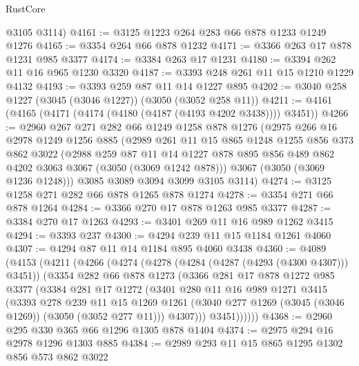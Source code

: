 \begin{lexlean}{RustCore}
\begin{coremodule}
      @3105
      @3114)
@4161 := @3125 @1223 @264 @283 @66 @878 @1233 @1249 @1276
@4165 := @3354 @264 @66 @878 @1232
@4171 := @3366 @263 @17 @878 @1231 @985 @3377
@4174 := @3384 @263 @17 @1231
@4180 := @3394 @262 @11 @16 @965 @1230 @3320
@4187 := @3393 @248 @261 @11 @15 @1210 @1229 @4132
@4193 := @3393 @259 @87 @11 @14 @1227 @895
@4202 := @3040 @258 @1227 (@3045 (@3046 @1227)) (@3050 (@3052 @258 @11))
@4211 := @4161 (@4165 (@4171 (@4174 (@4180 (@4187 (@4193 @4202 @3438)))) @3451))
@4266 := @2960
    @267
    @271
    @282
    @66
    @1249
    @1258
    @878
    @1276
    (@2975
      @266
      @16
      @2978
      @1249
      @1256
      @885
      (@2989
        @261
        @11
        @15
        @865
        @1248
        @1255
        @856
        @373
        @862
        @3022
        (@2988
          @259
          @87
          @11
          @14
          @1227
          @878
          @895
          @856
          @489
          @862
          @4202
          @3063
          @3067
          (@3050 (@3069 @1242 @878)))
        @3067
        (@3050 (@3069 @1236 @1248)))
      @3085
      @3089
      @3094
      @3099
      @3105
      @3114)
@4274 := @3125 @1258 @271 @282 @66 @878 @1265 @878 @1274
@4278 := @3354 @271 @66 @878 @1264
@4284 := @3366 @270 @17 @878 @1263 @985 @3377
@4287 := @3384 @270 @17 @1263
@4293 := @3401 @269 @11 @16 @989 @1262 @3415
@4294 := @3393 @237
@4300 := @4294 @239 @11 @15 @1184 @1261 @4060
@4307 := @4294 @87 @11 @14 @1184 @895 @4060 @3438
@4360 := @4089
    (@4153
      (@4211
        (@4266
          (@4274
            (@4278 (@4284 (@4287 (@4293 (@4300 @4307))) @3451))
            (@3354
              @282
              @66
              @878
              @1273
              (@3366
                @281
                @17
                @878
                @1272
                @985
                @3377
                (@3384
                  @281
                  @17
                  @1272
                  (@3401
                    @280
                    @11
                    @16
                    @989
                    @1271
                    @3415
                    (@3393
                      @278
                      @239
                      @11
                      @15
                      @1269
                      @1261
                      (@3040 @277 @1269 (@3045 (@3046 @1269)) (@3050 (@3052 @277 @11)))
                      @4307)))
                @3451))))))
@4368 := @2960 @295 @330 @365 @66 @1296 @1305 @878 @1404
@4374 := @2975 @294 @16 @2978 @1296 @1303 @885
@4384 := @2989 @293 @11 @15 @865 @1295 @1302 @856 @573 @862 @3022

\end{coremodule}
\end{lexlean}
